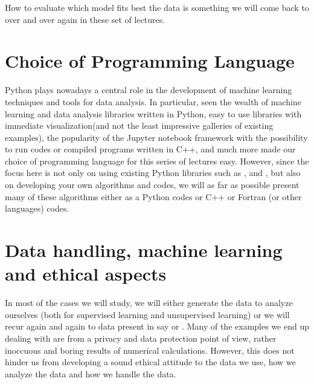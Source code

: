 \documentclass[letterpaper,10pt,english]{sphinxmanual}
\begin{document}
How to evaluate which model fits best the data is something we will come back to over and over again in these set of lectures.


\chapter{Choice of Programming Language}
\label{\detokenize{chapter1:choice-of-programming-language}}
Python plays nowadays a central role in the development of machine
learning techniques and tools for data analysis. In particular, seen
the wealth of machine learning and data analysis libraries written in
Python, easy to use libraries with immediate visualization(and not the
least impressive galleries of existing examples), the popularity of the
Jupyter notebook framework with the possibility to run  codes or
compiled programs written in C++, and much more made our choice of
programming language for this series of lectures easy. However,
since the focus here is not only on using existing Python libraries such
as ,  and , but also on developing your own
algorithms and codes, we will as far as possible present many of these
algorithms either as a Python codes or C++ or Fortran (or other languages) codes.


\chapter{Data handling, machine learning  and ethical aspects}
\label{\detokenize{chapter1:data-handling-machine-learning-and-ethical-aspects}}
In most of the cases we will study, we will either generate the data
to analyze ourselves (both for supervised learning and unsupervised
learning) or we will recur again and again to data present in say
 or .  Many of the examples we end up
dealing with are from a privacy and data protection point of view,
rather inoccuous and boring results of numerical
calculations. However, this does not hinder us from developing a sound
ethical attitude to the data we use, how we analyze the data and how
we handle the data.
\end{document}
